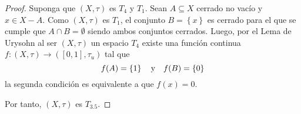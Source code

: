 \documentclass[12pt]{report}
\theoremstyle{largebreak}
\newcommand\cf[3]{\ensuremath{#1:#2\rightarrow#3}}
\begin{document}
    \begin{proof}
        Suponga que $(X,\tau)$ es $T_4$ y $T_1$. Sean $A\subseteq X$ cerrado no vacío y $x\in X-A$. Como $(X,\tau)$ es $T_1$, el conjunto $B=\left\{x \right\}$ es cerrado para el que se cumple que $A\cap B=\emptyset$ siendo ambos conjuntos cerrados. Luego, por el Lema de Urysohn al ser $(X,\tau)$ un espacio $T_4$ existe una función continua $\cf{f}{(X,\tau)}{([0,1],\tau_u)}$ tal que
        \begin{equation*}
            f(A)=\left\{1 \right\}\quad\textup{y}\quad f(B)=\left\{0 \right\}
        \end{equation*}
        la segunda condición es equivalente a que $f(x)=0$.

        Por tanto, $(X,\tau)$ es $T_{3.5}$.
    \end{proof}
\end{document}
